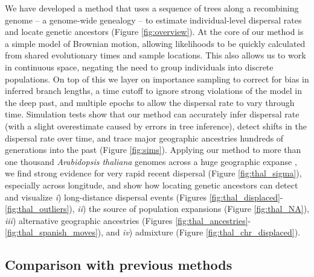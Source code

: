 \documentclass[12pt]{article}
\begin{document}
We have developed a method that uses a sequence of trees along a recombining genome -- a genome-wide genealogy -- to estimate individual-level dispersal rates and locate genetic ancestors (Figure \ref{fig:overview}). 
At the core of our method is a simple model of Brownian motion, allowing likelihoods to be quickly calculated from shared evolutionary times and sample locations.
This also allows us to work in continuous space, negating the need to group individuals into discrete populations.
On top of this we layer on importance sampling to correct for bias in inferred branch lengths, a time cutoff to ignore strong violations of the model in the deep past, and multiple epochs to allow the dispersal rate to vary through time. 
Simulation tests show that our method can accurately infer dispersal rate (with a slight overestimate caused by errors in tree inference), detect shifts in the dispersal rate over time, and trace major geographic ancestries hundreds of generations into the past (Figure \ref{fig:sims}).
Applying our method to more than one thousand \textit{Arabidopsis thaliana} genomes across a huge geographic expanse \citep{alonso2016}, we find strong evidence for very rapid recent dispersal (Figure \ref{fig:thal_sigma}), especially across longitude, and show how locating genetic ancestors can detect and visualize \textit{i}) long-distance dispersal events (Figures \ref{fig:thal_displaced}-\ref{fig:thal_outliers}), \textit{ii}) the source of population expansions (Figure \ref{fig:thal_NA}), \textit{iii}) alternative geographic ancestries (Figures \ref{fig:thal_ancestries}-\ref{fig:thal_spanish_moves}), and \textit{iv}) admixture (Figure \ref{fig:thal_chr_displaced}).

\subsection*{Comparison with previous methods}
\end{document}
